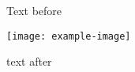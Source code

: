 \documentclass{article}
\begin{document}
Text before
\bigskip

\begin{minipage}{\linewidth}
  \centering
  \texttt{[image: example-image]}
\end{minipage}

\bigskip
text after
\end{document}
